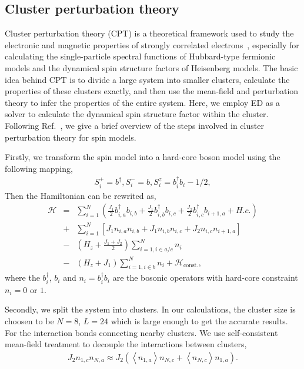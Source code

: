 \documentclass[aps,prx,showpacs,floatfix,twocolumn,superscriptaddress,nofootinbib,longbibliography]{revtex4-2}
\begin{document}
 \subsection{ Cluster perturbation theory}
Cluster perturbation theory (CPT) is a theoretical framework used to study the electronic and magnetic properties of strongly correlated electrons~\cite{PhysRevB.48.418,PhysRevLett.84.522,RevModPhys.77.1027,PhysRevB.98.134410}, especially for calculating the single-particle spectral functions of Hubbard-type fermionic models and the dynamical spin structure factors of Heisenberg models. The basic idea behind CPT is to divide a large system into smaller clusters, calculate the properties of these clusters exactly, and then use the mean-field and perturbation theory to infer the properties of the entire system. Here, we employ ED as a solver to calculate the dynamical spin structure factor within the cluster. Following Ref.~, we give a brief overview of the steps involved in cluster perturbation theory for spin models.

Firstly, we transform the spin model into a hard-core boson model using the following mapping,
\begin{eqnarray}
	S_i^+=b^\dagger, S_i^-=b, S_i^z=b_i^{\dagger}b_i-1/2,
\end{eqnarray}
Then the Hamiltonian can be rewrited as,
\begin{eqnarray}
	\mathcal{H}&=&\sum_{i=1}^{N}  \left( \frac{J_1}{2} b_{i,a}^\dagger b_{i,b} + \frac{J_1}{2} b_{i,b}^\dagger b_{i,c} + \frac{J_2}{2} b_{i,c}^\dagger b_{i+1,a} + H.c. \right) \nonumber \\
    &+&\sum_{i=1}^{N}\left[ J_1 n_{i,a} n_{i,b}+J_1 n_{i,b} n_{i,c}
	+ J_2 n_{i,c}n_{i+1,a} \right]  \nonumber \\
 &-& \left(H_z + \frac{J_1 + J_2}{2}\right) \sum_{i=1,i\in a/c}^{N} n_i \nonumber \\
	&-& \left(H_z + J_1\right) \sum_{i=1,i\in b}^{N} n_i + \mathcal{H}_\mathrm{const.},
\end{eqnarray}
where the $b_i^\dagger$, $b_i$ and $n_i=b_i^\dagger b_i$ are the bosonic operators with hard-core constraint $n_i=0$ or $1$.

Secondly, we split the system into clusters. In our calculations, the cluster size is choosen to be $N=8$, $ L=24$ which is large enough to get the accurate results. For the interaction bonds connecting nearby clusters. We use self-consistent mean-field treatment to decouple the interactions between clusters,
\begin{eqnarray}
	J_2 n_{1,c}n_{N,a}\approx J_2\left(\left\langle n_{1,a}\right\rangle n_{N,c}+\left\langle n_{N,c}\right\rangle n_{1,a}\right).
\end{eqnarray}
\end{document}
